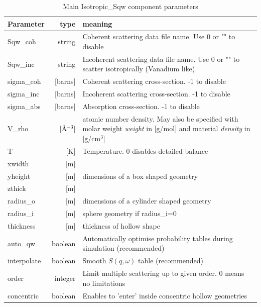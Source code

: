 \begin{table}
  \begin{center}
  {\let\my=\\
    \begin{tabular}{|lr|p{}|}
    \hline
Parameter & type & meaning \\
    \hline
Sqw\_coh   & string              & Coherent scattering data file name. Use 0 or "" to disable  \\
Sqw\_inc   & string              & Incoherent scattering data file name. Use 0 or "" to scatter isotropically (Vanadium like)  \\
sigma\_coh & [barns]      & Coherent scattering cross-section. -1 to disable \\
sigma\_inc & [barns]      & Incoherent scattering cross-section. -1 to disable \\
sigma\_abs & [barns]      & Absorption cross-section. -1 to disable  \\
V\_rho     & [\AA$^{-3}$] & atomic number density. May also be specified with molar weight \emph{weight} in [g/mol] and material \emph{density} in [g/cm$^3$] \\
T          & [K]          & Temperature. 0 disables detailed balance \\
    \hline
xwidth   & [m] & \\
yheight  & [m] & dimensions of a box shaped geometry \\
zthick   & [m] & \\
radius\_o & [m] & dimensions of a cylinder shaped geometry  \\
radius\_i & [m] & sphere geometry if radius\_i=0  \\
thickness& [m] & thickness of hollow shape  \\
    \hline
auto\_qw  & boolean & Automatically optimise probability tables during simulation (recommended)  \\
interpolate & boolean & Smooth $S(q,\omega)$ table (recommended) \\
order     & integer & Limit multiple scattering up to given order. 0 means no limitations  \\
concentric& boolean & Enables to 'enter' inside concentric hollow geometries  \\
    \hline
    \end{tabular}
    \caption{Main Isotropic\_Sqw component parameters}
    \label{t:sqw-param}
  }
  \end{center}
\end{table}

